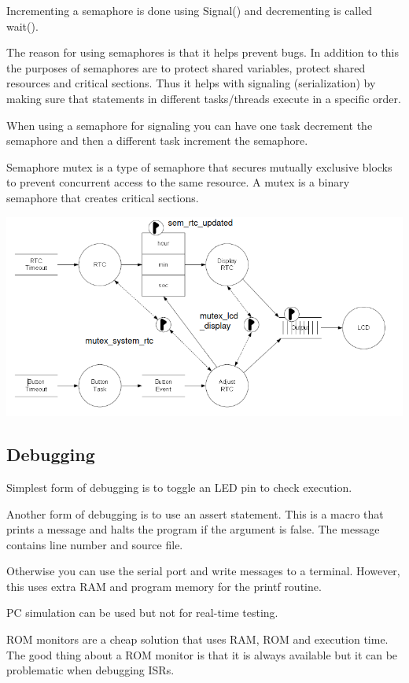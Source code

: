 Incrementing a semaphore is done using Signal() and decrementing
is called wait().

The reason for using semaphores is that it helps prevent bugs.
In addition to this the purposes of semaphores are to protect shared
variables, protect shared resources and critical sections.
Thus it helps with signaling (serialization)
by making sure that statements in different tasks/threads execute
in a specific order.

When using a semaphore for signaling you can have one task decrement the semaphore
and then a different task increment the semaphore.

Semaphore mutex is a type of semaphore that secures mutually exclusive
blocks to prevent concurrent access to the same resource.
A mutex is a binary semaphore that creates critical sections.

\begin{center}
	\includegraphics[width=\textwidth]{images/taskSemaphore.png}
\end{center}


\subsection{Debugging}
Simplest form of debugging is to toggle an LED pin to check execution.

Another form of debugging is to use an assert statement. This
is a macro that prints a message and halts the program if the
argument is false. The message contains line number and source file.

Otherwise you can use the serial port and write messages to a terminal.
However, this uses extra RAM and program memory for the printf routine.

PC simulation can be used but not for real-time testing.

ROM monitors are a cheap solution that uses RAM, ROM and execution time.
The good thing about a ROM monitor is that it is always available
but it can be problematic when debugging ISRs.

